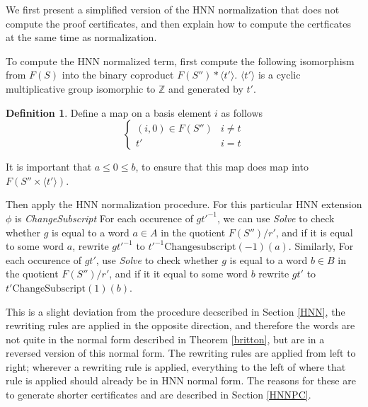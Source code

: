 \documentclass[11pt]{article} %
\theoremstyle{definition}
\theoremstyle{definition}
\theoremstyle{definition}
\theoremstyle{definition}
\theoremstyle{definition}
\newtheorem{defn}[theorem]{Definition}
\theoremstyle{definition}
\begin{document}
We first present a simplified version of the HNN normalization that does not compute
the proof certificates, and then explain how to compute the certficates at the same time as normalization.

To compute the HNN normalized term, first compute the following isomorphism from $F(S)$ into the binary
coproduct $F(S'') \ast \langle t' \rangle$. $\langle t' \rangle$ is a cyclic
multiplicative group isomorphic to $\mathbb{Z}$ and generated by $t'$.

\begin{defn}\label{tocoprod}
  Define a map on a basis element $i$ as follows
  \begin{equation}
    \begin{cases}
      (i, 0) \in F(S'') & i \ne t \\
      t' & i = t
    \end{cases}
  \end{equation}
\end{defn}

It is important that $a \le 0 \le b$, to ensure that this map does map into $F(S'' \times \langle t' \rangle)$.

Then apply the HNN normalization procedure. For this particular HNN extension
$\phi$ is \textit{ChangeSubscript} %
For each occurence of
$gt'^{-1}$, we can use \textit{Solve} to check whether $g$ is equal
to a word  $a \in A$ in the quotient $F(S'') / r'$, and if it is equal to some word $a$, rewrite
$gt'^{-1}$ to $t'^{-1}\text{Changesubscript}(-1)(a)$. Similarly, For each occurence of $gt'$, use \textit{Solve}
to check whether $g$ is equal to a word $b \in B$ in the quotient $F(S'') / r'$, and if it it equal to
some word $b$ rewrite $gt'$ to $t'\text{ChangeSubscript}(1)(b)$.

This is a slight deviation from the procedure decscribed in
Section \ref{HNN}, the rewriting rules are applied in the opposite direction, and therefore
the words are not quite in the normal form described in Theorem \ref{britton}, but are in a reversed
version of this normal form.  The rewriting rules are applied from left to right; wherever a rewriting rule
is applied, everything to the left of where that rule is applied should already be in
HNN normal form. The reasons for these are to generate shorter certificates and are described
in Section \ref{HNNPC}.

\end{document}
